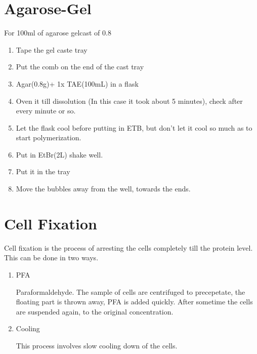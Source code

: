 \documentclass[11pt,twoside,a4paper]{article}
\begin{document}
\section{Agarose-Gel}
For 100ml of agarose gelcast of 0.8%
\begin{enumerate}
	\item Tape the gel caste tray
	\item Put the comb on the end of the cast tray
	\item Agar(0.8g)+ 1x TAE(100mL) in a flask
	\item Oven it till dissolution (In this case it took about 5 minutes), check after every minute or so.
	\item Let the flask cool before putting in ETB, but don't let it cool so much as to start polymerization.
	\item Put in EtBr(2\textmu{}L) shake well.
	\item Put it in the tray
	\item Move the bubbles away from the well, towards the ends.
\end{enumerate}

\section{Cell Fixation}
Cell fixation is the process of arresting the cells completely till the protein level. This can be done in two ways.
\begin{enumerate}
	\item PFA

		Paraformaldehyde. The sample of cells are centrifuged to precepetate, the floating part is thrown away, PFA is added quickly. After sometime the cells are suspended again, to the original concentration.
	\item Cooling

		This process involves slow cooling down of the cells.
\end{enumerate}
\end{document}
